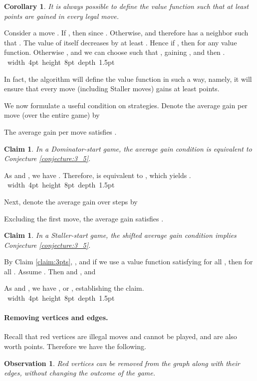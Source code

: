 \documentclass[11pt]{article}
\def\Proof{\par\noindent{\bf Proof:~}}
\def\blackslug{\hbox{\hskip 1pt \vrule width 4pt height 8pt
    depth 1.5pt \hskip 1pt}}
\def\QED{\quad\blackslug\lower 8.5pt\null\par}
\newtheorem{claim}[theorem]{Claim}
\newtheorem{corollary}[theorem]{Corollary}
\newtheorem{observation}[theorem]{Observation}
\theoremstyle{definition}
\begin{document}
\begin{corollary}
\label{cor:3pts_def}
It is always possible to define the value function such that at least  points are gained in every legal move.
\end{corollary}
\Proof
Consider a move . If , then  since .
Otherwise,  and therefore  has a neighbor  such that .
The value of  itself decreases by at least . Hence if , then  for any value function.
Otherwise , and we can choose  such that , gaining , and then .
\QED
In fact, the algorithm will define the value function in such a way, namely, it will ensure that every move (including Staller moves) gains at least  points.

We now formulate a useful condition on strategies. 
Denote the average gain per move (over the entire game) by

\smallskip
\par{}
The average gain per move satisfies .
\begin{claim}
\label{claim:avg_5}
In a Dominator-start game, the average gain condition is equivalent to Conjecture \ref{conjecture:3_5}.
\end{claim}
\Proof
As  and , we have . 
Therefore,  is equivalent to 
,
 which yields .
\QED

Next, denote the average gain over steps  by 
~~~~~ 
\smallskip
\par{}
Excluding the first move, the average gain satisfies .
\begin{claim}
\label{claim:staller_start_cond}
In a Staller-start game, the shifted average gain condition implies
Conjecture \ref{conjecture:3_5}.
\end{claim}
\Proof
By Claim \ref{claim:3pts}, , and if we use a value function  satisfying  for all , then 
 for all .
Assume .
Then  and , and 

As  and , we have
, or 
,
establishing the claim.
\QED

\paragraph{Removing vertices and edges.}
Recall that red vertices are illegal moves and cannot be played, and are also worth  points. Therefore we have the following.

\begin{observation}
Red vertices can be removed from the graph along with their edges, without changing the outcome of the game.
\end{observation}
\end{document}
